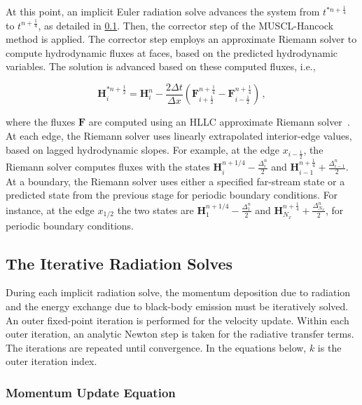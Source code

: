 \documentclass[preprint,12pt]{elsarticle}
\newcommand{\pec}{\, ,}
\newcommand{\half}{\frac{1}{2}}
\newcommand{\fourth}{\frac{1}{4}}
\renewcommand{\H}{\mathbf{H}}
\newcommand{\Flux}{\mathbf{F}}
\newcommand{\dt}{\Delta t}
\newcommand{\dx}{\Delta x}
\newcommand{\hydroCorrector}[5]{
\begin{equation}#5
  \H_i^{#3} = \H_i^{#1} - \frac{#4\dt}{\dx}
  \left(\Flux_{i+\half}^{#2} - \Flux_{i-\half}^{#2}\right) \pec
\end{equation}
}
\begin{document}
At this point, an implicit Euler radiation solve advances the system from $t^{*n+\fourth}$
to $t^{n+\fourth}$, as detailed in \ref{sec:rad_solves}.  Then, the corrector step of the
MUSCL-Hancock method is applied.  The corrector step employs an approximate Riemann solver
to compute hydrodynamic fluxes at faces, based on the predicted hydrodynamic variables.  The solution is
advanced based on these computed fluxes, i.e.,
\hydroCorrector{n}{n+\fourth}{*n+\half}{2}{\label{eq:muscl_corrector}}
where the fluxes $\mathbf{F}$ are computed using an HLLC approximate Riemann solver~\cite{toro}.  At
each edge, the Riemann solver uses linearly extrapolated interior-edge values, based on lagged
hydrodynamic slopes.  For example, at the edge
$x_{i-\half}$, the Riemann solver computes fluxes with the states
$\H_{i}^{n+1/4}-\frac{\Delta_i^n}{2}$ and $\H_{i-1}^{n+\fourth}+\frac{\Delta_{i-1}^n}{2}$.  At a boundary,
the Riemann solver uses either a specified far-stream state or a predicted state from the previous stage for periodic boundary conditions.  For instance,
at the edge $x_{1/2}$ the two states are $\H_{1}^{n+1/4} - \frac{\Delta_1^n}{2}$ and
$\H_{N_x}^{n+\fourth}+\frac{\Delta_{N_x}^{n}}{2}$, for periodic 
boundary conditions.

\subsection{The Iterative Radiation Solves}
\label{sec:rad_solves}

During each implicit radiation solve, the momentum deposition due to radiation and the
energy exchange due to black-body emission must be iteratively solved.  An outer fixed-point
iteration is performed for the velocity update.  Within each outer iteration, an analytic
Newton step is taken for the radiative transfer terms.  The iterations are repeated until 
convergence.  In the equations below, $k$ is the outer iteration index. 

\subsubsection{Momentum Update Equation}
\end{document}
